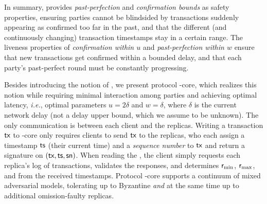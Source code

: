 In summary, \podtm provides \emph{past-perfection} and \emph{confirmation bounds} as safety properties, ensuring parties cannot be blindsided by transactions suddenly appearing as confirmed too far in the past, and that the different (and continuously changing) transaction timestamps stay in a certain range. The liveness properties of \emph{confirmation within $u$} and \emph{past-perfection within $w$} ensure that new transactions get confirmed within a bounded delay, and that each party's past-perfect round must be constantly progressing.

Besides introducing the notion of \podtm, we present protocol \podtm-core, which realizes this notion while requiring minimal interaction among parties and achieving optimal latency, \textit{i.e.}, optimal parameters $u=2\delta$ and $w=\delta$, where $\delta$ is the current network delay (not a delay upper bound, which we assume to be unknown).
The only communication is between each client and the replicas.
Writing a transaction $\textsf{tx}$ to \podtm-core only requires clients to send $\textsf{tx}$ to the replicas, who each assign a timestamp $\textsf{ts}$ (their current time) and a \emph{sequence number} \sn to $\textsf{tx}$ and return a signature on $(\textsf{tx},\textsf{ts}, \textsf{sn})$. When reading the \podtm, the client simply requests each replica's log of transactions, validates the responses, and determines $\textsf{r}_\text{min}$, $\textsf{r}_\text{max}$, and \rconf from the received timestamps.
Protocol \podtm-core supports a continuum of mixed adversarial models, tolerating up to \beta Byzantine \emph{and} at the same time up to \gamma additional omission-faulty replicas.



